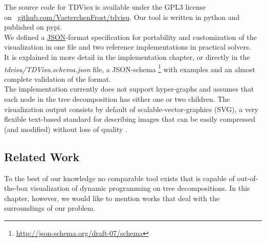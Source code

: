 \documentclass[a4paper, 12pt, bibliography=totoc]{scrartcl}
\begin{document}
The source code for TDVisu is available under the GPL3 license \\on
\mbox{ \url{github.com/VaeterchenFrost/tdvisu}}. Our tool is written in python and published on pypi.\\

We defined a \href{https://www.json.org/json-en.html}{JSON}-format specification for portability and customization of the visualization in one file and two reference implementations in practical solvers.\\
It is explained in more detail in the implementation chapter, or directly in the \textit{tdvisu/TDVisu.schema.json} file, a JSON-schema \footnote{\url{http://json-schema.org/draft-07/schema}} with examples and an almost complete validation of the format.\\

The implementation currently does not support hyper-graphs and assumes that each node in the tree decomposition has either one or two children.
The visualization output consists by default of scalable-vector-graphics (SVG), a very flexible text-based standard for describing images that can be easily compressed (and modified) without loss of quality \cite{SVGMozilla}.



\subsection{Related Work}

To the best of our knowledge no comparable tool exists that is capable of out-of-the-box visualization of dynamic programming on tree decompositions.
In this chapter, however, we would like to mention works that deal with the surroundings of our problem.
\end{document}

